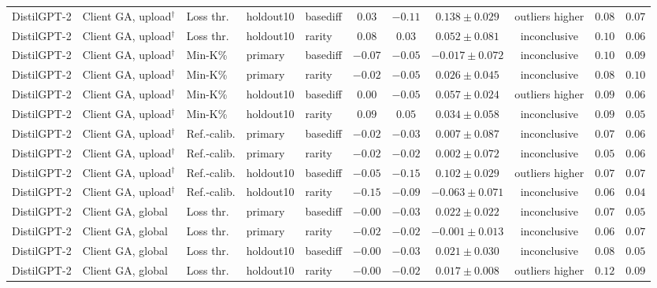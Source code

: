\begin{table}[t]
\begin{tabular*}{\textwidth}{@{\extracolsep{\fill}}lllllcccccc@{}}
DistilGPT-2 & Client GA, upload$^{\dagger}$ & Loss thr. & holdout10 & basediff & $0.03$ & $-0.11$ & $0.138 \pm 0.029$ & outliers higher & $0.08$ & $0.07$ \\
DistilGPT-2 & Client GA, upload$^{\dagger}$ & Loss thr. & holdout10 & rarity & $0.08$ & $0.03$ & $0.052 \pm 0.081$ & inconclusive & $0.10$ & $0.06$ \\
DistilGPT-2 & Client GA, upload$^{\dagger}$ & Min-K\% & primary & basediff & $-0.07$ & $-0.05$ & $-0.017 \pm 0.072$ & inconclusive & $0.10$ & $0.09$ \\
DistilGPT-2 & Client GA, upload$^{\dagger}$ & Min-K\% & primary & rarity & $-0.02$ & $-0.05$ & $0.026 \pm 0.045$ & inconclusive & $0.08$ & $0.10$ \\
DistilGPT-2 & Client GA, upload$^{\dagger}$ & Min-K\% & holdout10 & basediff & $0.00$ & $-0.05$ & $0.057 \pm 0.024$ & outliers higher & $0.09$ & $0.06$ \\
DistilGPT-2 & Client GA, upload$^{\dagger}$ & Min-K\% & holdout10 & rarity & $0.09$ & $0.05$ & $0.034 \pm 0.058$ & inconclusive & $0.09$ & $0.05$ \\
DistilGPT-2 & Client GA, upload$^{\dagger}$ & Ref.-calib. & primary & basediff & $-0.02$ & $-0.03$ & $0.007 \pm 0.087$ & inconclusive & $0.07$ & $0.06$ \\
DistilGPT-2 & Client GA, upload$^{\dagger}$ & Ref.-calib. & primary & rarity & $-0.02$ & $-0.02$ & $0.002 \pm 0.072$ & inconclusive & $0.05$ & $0.06$ \\
DistilGPT-2 & Client GA, upload$^{\dagger}$ & Ref.-calib. & holdout10 & basediff & $-0.05$ & $-0.15$ & $0.102 \pm 0.029$ & outliers higher & $0.07$ & $0.07$ \\
DistilGPT-2 & Client GA, upload$^{\dagger}$ & Ref.-calib. & holdout10 & rarity & $-0.15$ & $-0.09$ & $-0.063 \pm 0.071$ & inconclusive & $0.06$ & $0.04$ \\
DistilGPT-2 & Client GA, global & Loss thr. & primary & basediff & $-0.00$ & $-0.03$ & $0.022 \pm 0.022$ & inconclusive & $0.07$ & $0.05$ \\
DistilGPT-2 & Client GA, global & Loss thr. & primary & rarity & $-0.02$ & $-0.02$ & $-0.001 \pm 0.013$ & inconclusive & $0.06$ & $0.07$ \\
DistilGPT-2 & Client GA, global & Loss thr. & holdout10 & basediff & $-0.00$ & $-0.03$ & $0.021 \pm 0.030$ & inconclusive & $0.08$ & $0.05$ \\
DistilGPT-2 & Client GA, global & Loss thr. & holdout10 & rarity & $-0.00$ & $-0.02$ & $0.017 \pm 0.008$ & outliers higher & $0.12$ & $0.09$ \\

\end{tabular*}
\end{table}
